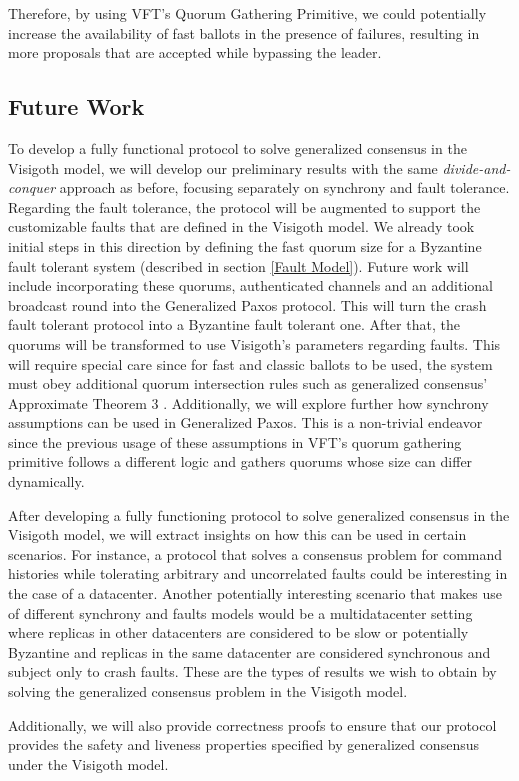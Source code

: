 Therefore, by using VFT's Quorum Gathering Primitive, we could potentially increase the availability of fast ballots in the presence of failures, resulting in more proposals that are accepted while bypassing the leader. \par

\subsection{Future Work} \label{Future Work}

To develop a fully functional protocol to solve generalized consensus in the Visigoth model, we will develop our preliminary results with the same \textit{divide-and-conquer} approach as before, focusing separately on synchrony and fault tolerance. Regarding the fault tolerance, the protocol will be augmented to support the customizable faults that are defined in the Visigoth model. We already took initial steps in this direction by defining the fast quorum size for a Byzantine fault tolerant system (described in section \ref{Fault Model}). Future work will include incorporating these quorums, authenticated channels and an additional broadcast round into the Generalized Paxos protocol. This will turn the crash fault tolerant protocol into a Byzantine fault tolerant one. After that, the quorums will be transformed to use Visigoth's parameters regarding faults. This will require special care since for fast and classic ballots to be used, the system must obey additional quorum intersection rules such as generalized consensus' Approximate Theorem 3 \cite{Lamport2005}. Additionally, we will explore further how synchrony assumptions can be used in Generalized Paxos. This is a non-trivial endeavor since the previous usage of these assumptions in VFT's quorum gathering primitive follows a different logic and gathers quorums whose size can differ dynamically. \par
After developing a fully functioning protocol to solve generalized consensus in the Visigoth model, we will extract insights on how this can be used in certain scenarios. For instance, a protocol that solves a consensus problem for command histories while tolerating arbitrary and uncorrelated faults could be interesting in the case of a datacenter. Another potentially interesting scenario that makes use of different synchrony and faults models would be a multidatacenter setting where replicas in other datacenters are considered to be slow or potentially Byzantine and replicas in the same datacenter are considered synchronous and subject only to crash faults. These are the types of results we wish to obtain by solving the generalized consensus problem in the Visigoth model.\par
Additionally, we will also provide correctness proofs to ensure that our protocol provides the safety and liveness properties specified by generalized consensus under the Visigoth model. 
